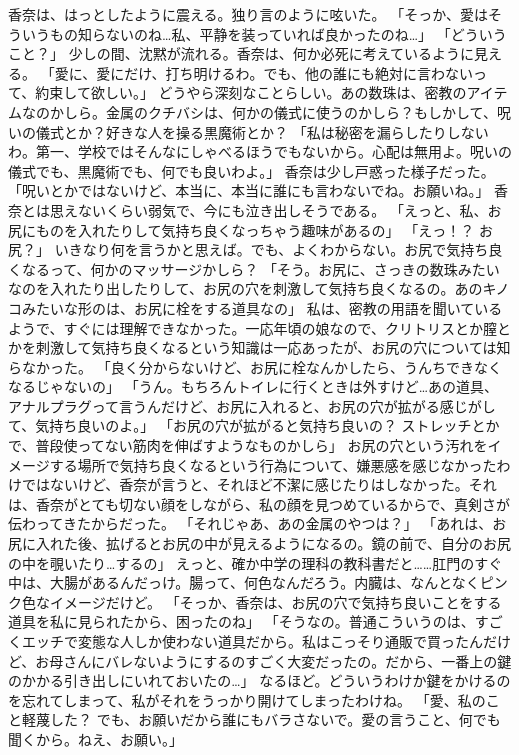 香奈は、はっとしたように震える。独り言のように呟いた。
「そっか、愛はそういうもの知らないのね…私、平静を装っていれば良かったのね…」
「どういうこと？」
少しの間、沈黙が流れる。香奈は、何か必死に考えているように見える。
「愛に、愛にだけ、打ち明けるわ。でも、他の誰にも絶対に言わないって、約束して欲しい。」
どうやら深刻なことらしい。あの数珠は、密教のアイテムなのかしら。金属のクチバシは、何かの儀式に使うのかしら？もしかして、呪いの儀式とか？好きな人を操る黒魔術とか？
「私は秘密を漏らしたりしないわ。第一、学校ではそんなにしゃべるほうでもないから。心配は無用よ。呪いの儀式でも、黒魔術でも、何でも良いわよ。」
香奈は少し戸惑った様子だった。
「呪いとかではないけど、本当に、本当に誰にも言わないでね。お願いね。」
香奈とは思えないくらい弱気で、今にも泣き出しそうである。
「えっと、私、お尻にものを入れたりして気持ち良くなっちゃう趣味があるの」
「えっ！？ お尻？」
いきなり何を言うかと思えば。でも、よくわからない。お尻で気持ち良くなるって、何かのマッサージかしら？
「そう。お尻に、さっきの数珠みたいなのを入れたり出したりして、お尻の穴を刺激して気持ち良くなるの。あのキノコみたいな形のは、お尻に栓をする道具なの」
私は、密教の用語を聞いているようで、すぐには理解できなかった。一応年頃の娘なので、クリトリスとか膣とかを刺激して気持ち良くなるという知識は一応あったが、お尻の穴については知らなかった。
「良く分からないけど、お尻に栓なんかしたら、うんちできなくなるじゃないの」
「うん。もちろんトイレに行くときは外すけど…あの道具、アナルプラグって言うんだけど、お尻に入れると、お尻の穴が拡がる感じがして、気持ち良いのよ。」
「お尻の穴が拡がると気持ち良いの？ ストレッチとかで、普段使ってない筋肉を伸ばすようなものかしら」
お尻の穴という汚れをイメージする場所で気持ち良くなるという行為について、嫌悪感を感じなかったわけではないけど、香奈が言うと、それほど不潔に感じたりはしなかった。それは、香奈がとても切ない顔をしながら、私の顔を見つめているからで、真剣さが伝わってきたからだった。
「それじゃあ、あの金属のやつは？」
「あれは、お尻に入れた後、拡げるとお尻の中が見えるようになるの。鏡の前で、自分のお尻の中を覗いたり…するの」
えっと、確か中学の理科の教科書だと……肛門のすぐ中は、大腸があるんだっけ。腸って、何色なんだろう。内臓は、なんとなくピンク色なイメージだけど。
「そっか、香奈は、お尻の穴で気持ち良いことをする道具を私に見られたから、困ったのね」
「そうなの。普通こういうのは、すごくエッチで変態な人しか使わない道具だから。私はこっそり通販で買ったんだけど、お母さんにバレないようにするのすごく大変だったの。だから、一番上の鍵のかかる引き出しにいれておいたの…」
なるほど。どういうわけか鍵をかけるのを忘れてしまって、私がそれをうっかり開けてしまったわけね。
「愛、私のこと軽蔑した？ でも、お願いだから誰にもバラさないで。愛の言うこと、何でも聞くから。ねえ、お願い。」
